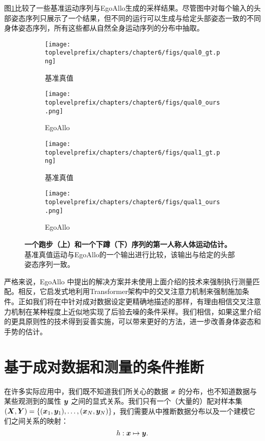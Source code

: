 \documentclass[../../book-main.tex]{subfiles}
\begin{document}
图\ref{fig:comparison}比较了一些基准运动序列与EgoAllo生成的采样结果。尽管图中对每个输入的头部姿态序列只展示了一个结果，但不同的运行可以生成与给定头部姿态一致的不同身体姿态序列，所有这些都从自然全身运动序列的分布中抽取。
\begin{figure}[t]
\centering
\begin{subfigure}{0.45\textwidth}
  \centering
  \texttt{[image: \\toplevelprefix/chapters/chapter6/figs/qual0\_gt.png]}
  \caption{\centering 基准真值}
\end{subfigure}
\hfill
\begin{subfigure}{0.45\textwidth}
  \centering
  \texttt{[image: \\toplevelprefix/chapters/chapter6/figs/qual0\_ours.png]}
  \caption{EgoAllo}
\end{subfigure}

\begin{subfigure}{0.45\textwidth}
  \centering
  \texttt{[image: \\toplevelprefix/chapters/chapter6/figs/qual1\_gt.png]}
  \caption{\centering 基准真值}
\end{subfigure}
\hfill
\begin{subfigure}{0.45\textwidth}
  \centering
  \texttt{[image: \\toplevelprefix/chapters/chapter6/figs/qual1\_ours.png]}
  \caption{EgoAllo}
\end{subfigure}

\caption{
\textbf{一个跑步（上）和一个下蹲（下）序列的第一人称人体运动估计。}
基准真值运动与EgoAllo的一个输出进行比较，该输出与给定的头部姿态序列一致。
}
\label{fig:comparison}
\end{figure}

严格来说，EgoAllo \cite{yi2024egoallo}中提出的解决方案并未使用上面介绍的技术来强制执行测量匹配。相反，它启发式地利用Transformer架构中的交叉注意力机制来强制施加条件。正如我们将在中针对成对数据设定更精确地描述的那样，有理由相信交叉注意力机制在某种程度上近似地实现了后验去噪的条件采样。我们相信，如果这里介绍的更具原则性的技术得到妥善实施，可以带来更好的方法，进一步改善身体姿态和手势的估计。

\section{基于成对数据和测量的条件推断}
在许多实际应用中，我们既不知道我们所关心的数据 $\bm{x}$ 的分布，也不知道数据与某些观测到的属性 $\bm{y}$ 之间的显式关系。我们只有一个（大量的）配对样本集 $(\bm{X}, \bm{Y}) = \{ (\bm{x}_1, \bm{y}_1), \ldots, (\bm{x}_N, \bm{y}_N) \}$，我们需要从中推断数据分布以及一个建模它们之间关系的映射：
\begin{equation}
  h: \bm{x} \mapsto \bm{y}.
\end{equation}
\end{document}
